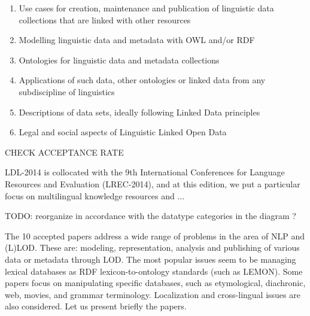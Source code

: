 \begin{enumerate}
\item Use cases %
for creation, maintenance and publication of linguistic data collections that are linked with other resources

\item Modelling linguistic data and metadata with OWL and/or RDF

\item Ontologies for linguistic data and metadata collections

\item Applications of such data, other ontologies or linked data from any subdiscipline of linguistics %

\item Descriptions of data sets, ideally following Linked Data principles

\item Legal and social aspects of Linguistic Linked Open Data
\end{enumerate}

CHECK ACCEPTANCE RATE

\smallskip

LDL-2014 is collocated with the 9th International Conferences for Language Resources and Evaluation (LREC-2014), and at this edition, we put a particular focus on multilingual knowledge resources and ...

TODO: reorganize in accordance with the datatype categories in the diagram ?

The 10 accepted papers address a wide range of problems in the area of NLP and 
(L)LOD. These are: modeling, representation, analysis and publishing of various 
data or metadata through LOD. The most popular issues seem to be managing lexical 
databases as RDF lexicon-to-ontology standards (such as LEMON). Some papers focus 
on manipulating specific databases, such as etymological, diachronic, web, movies, 
and grammar terminology. Localization and cross-lingual issues are also considered. 
Let us present briefly the papers.


